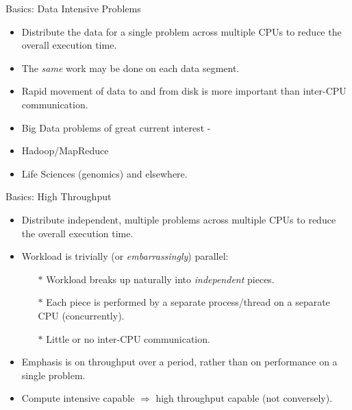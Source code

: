 \begin{frame}{Basics: Data Intensive Problems}
\begin{itemize}
\item{Distribute the \alert{data} for a \alert{single problem} across multiple CPUs to reduce the overall execution time.}
\pause
\item{The \emph{same} work may be done on each data segment.}
\pause
\item{Rapid movement of data to and from disk is more important than inter-CPU communication.}
\pause
\item{\alert{Big Data} problems of great current interest -}
\item{Hadoop/MapReduce}
\item{Life Sciences (genomics) and elsewhere.}
\end{itemize}
\end{frame}

\begin{frame}{Basics: High Throughput}
\begin{itemize}
\item{Distribute \alert{independent}, \alert{multiple problems} across multiple CPUs to reduce the overall execution time.}
\pause
\item{Workload is trivially (or \emph{embarrassingly}) parallel:}
\begin{itemize}
\item[$\ast$]{Workload breaks up naturally into \emph{independent} pieces.}
\item[$\ast$]{Each piece is performed by a separate process/thread on a separate CPU (concurrently).}
\item[$\ast$]{\alert{Little or no inter-CPU communication}.}
\end{itemize}
\pause
\item{Emphasis is on throughput over a period, rather than on performance on a single problem.}
\pause
\item{Compute intensive capable $\Rightarrow$ high throughput capable (not conversely).}
\end{itemize}
\end{frame}

